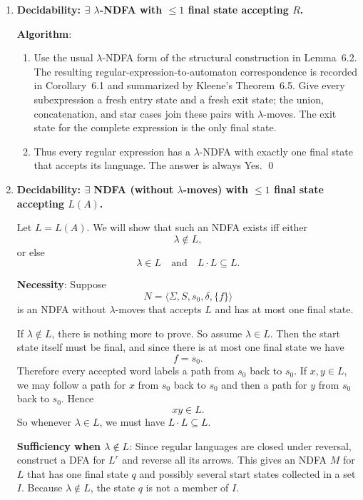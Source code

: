 \begin{enumerate}[{12.}1. ]
Therefore, for \emph{any} regular language, there always exists a DFA with $>31$ states accepting it. The answer is \textbf{always yes}. \qed

\item \textbf{Decidability: $\exists$ $\lambda$-NDFA with $\leq 1$ final state accepting $R$.}

\textbf{Algorithm}:
\begin{enumerate}
\item Use the usual $\lambda$-NDFA form of the structural construction in
Lemma~6.2.  The resulting regular-expression-to-automaton correspondence is
recorded in Corollary~6.1 and summarized by Kleene's Theorem~6.5. Give every
subexpression a fresh entry state
and a fresh exit state; the union, concatenation, and star cases join these
pairs with $\lambda$-moves.  The exit state for the complete expression is the
only final state.
\item Thus every regular expression has a $\lambda$-NDFA with exactly one
final state that accepts its language.  The answer is always Yes. \qed
\end{enumerate}

\item \textbf{Decidability: $\exists$ NDFA (without $\lambda$-moves) with $\leq 1$ final state accepting $L(A)$.}

Let $L=L(A)$. We will show that such an NDFA exists iff either
\[
\lambda\notin L,
\]
or else
\[
\lambda\in L \quad\text{and}\quad L\cdot L\subseteq L.
\]

\textbf{Necessity}: Suppose
\[
N=\langle \Sigma,S,s_0,\delta,\{f\}\rangle
\]
is an NDFA without $\lambda$-moves that accepts $L$ and has at most one final
state.

If $\lambda\notin L$, there is nothing more to prove. So assume $\lambda\in L$.
Then the start state itself must be final, and since there is at most one final
state we have
\[
f=s_0.
\]
Therefore every accepted word labels a path from $s_0$ back to $s_0$. If
$x,y\in L$, we may follow a path for $x$ from $s_0$ back to $s_0$ and then a
path for $y$ from $s_0$ back to $s_0$. Hence
\[
xy\in L.
\]
So whenever $\lambda\in L$, we must have $L\cdot L\subseteq L$.

\textbf{Sufficiency when $\lambda\notin L$}: Since regular languages are closed
under reversal, construct a DFA for $L^r$ and reverse all its arrows. This gives
an NDFA $M$ for $L$ that has one final state $q$ and possibly several start
states collected in a set $I$. Because $\lambda\notin L$, the state $q$ is not a
member of $I$.


\end{enumerate}
